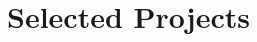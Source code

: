 \documentclass[11pt]{article}
\begin{document}
{\begin{tabularx}{\textwidth}{@{} p{} p{} @{}}
			\end{tabularx}
		}


\section{\textcolor{section_5}{Selected Projects}}
\vspace{-\baselineskip}
\end{document}
